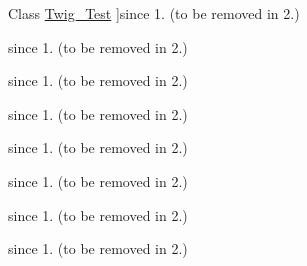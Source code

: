 \begin{DoxyRefList}
\hypertarget{deprecated__deprecated000040}{}%
Class \hyperlink{classTwig__Test}{Twig\+\_\+\+Test} ]since 1. (to be removed in 2.)  
\item[\label{deprecated__deprecated000037}%
\hypertarget{deprecated__deprecated000037}{}%
Class \hyperlink{classTwig__Test__Function}{Twig\+\_\+\+Test\+\_\+\+Function} ]since 1. (to be removed in 2.)  
\item[\label{deprecated__deprecated000038}%
\hypertarget{deprecated__deprecated000038}{}%
Class \hyperlink{classTwig__Test__Method}{Twig\+\_\+\+Test\+\_\+\+Method} ]since 1. (to be removed in 2.)  
\item[\label{deprecated__deprecated000039}%
\hypertarget{deprecated__deprecated000039}{}%
Class \hyperlink{classTwig__Test__Node}{Twig\+\_\+\+Test\+\_\+\+Node} ]since 1. (to be removed in 2.)  
\item[\label{deprecated__deprecated000041}%
\hypertarget{deprecated__deprecated000041}{}%
Class \hyperlink{interfaceTwig__TestCallableInterface}{Twig\+\_\+\+Test\+Callable\+Interface} ]since 1. (to be removed in 2.)  
\item[\label{deprecated__deprecated000042}%
\hypertarget{deprecated__deprecated000042}{}%
Class \hyperlink{interfaceTwig__TestInterface}{Twig\+\_\+\+Test\+Interface} ]since 1. (to be removed in 2.)  
\item[\label{deprecated__deprecated000043}%
\hypertarget{deprecated__deprecated000043}{}%
Class \hyperlink{classTwig__TokenParserBroker}{Twig\+\_\+\+Token\+Parser\+Broker} ]since 1. (to be removed in 2.)  
\item[\label{deprecated__deprecated000044}%
\hypertarget{deprecated__deprecated000044}{}%
Class \hyperlink{interfaceTwig__TokenParserBrokerInterface}{Twig\+\_\+\+Token\+Parser\+Broker\+Interface} ]since 1. (to be removed in 2.) 
\end{DoxyRefList}